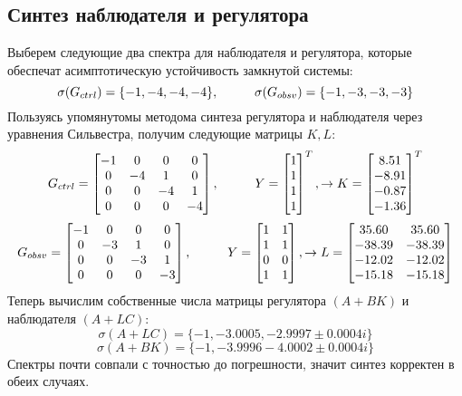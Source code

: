 \subsection{Синтез наблюдателя и регулятора}
Выберем следующие два спектра для наблюдателя и регулятора, которые обеспечат асимптотическую устойчивость замкнутой системы:
$$
    \sigma(G_{ctrl}) = \{-1, -4, -4, -4\}, \hspace*{1cm} \sigma(G_{obsv}) = \{-1, -3, -3, -3\}
$$
Пользуясь упомянутомы методома синтеза регулятора и наблюдателя через уравнения Сильвестра, получим следующие матрицы $K, L$:
$$
G_{ctrl} = \begin{bmatrix}
  -1  &   0  &   0  &   0 \\
  0  &  -4   &  1   &  0 \\
  0  &   0  &  -4  &   1 \\
  0   &  0   &  0  &  -4
\end{bmatrix}, \hspace*{1cm} Y = \begin{bmatrix} 1\\1\\1\\1 \end{bmatrix}^T, \rightarrow 
K = \begin{bmatrix} 8.51 \\ -8.91 \\ -0.87 \\ -1.36 \end{bmatrix}^T
$$
$$
G_{obsv} = \begin{bmatrix}
  -1  &   0  &   0  &   0 \\
  0  &  -3   &  1   &  0 \\
  0  &   0  &  -3  &   1 \\
  0   &  0   &  0  &  -3
\end{bmatrix}, \hspace*{1cm} Y = \begin{bmatrix}1&1\\1&1\\0&0\\1&1\end{bmatrix},\rightarrow
L = \begin{bmatrix}
  35.60 & 35.60\\
 -38.39 & -38.39\\
 -12.02 & -12.02\\
 -15.18 & -15.18
\end{bmatrix}
$$
Теперь вычислим собственные числа матрицы регулятора $(A+BK)$ и наблюдателя $(A+LC)$:
$$
    \sigma(A+LC) = \{-1, -3.0005, -2.9997 \pm 0.0004i\}
$$
$$
  \sigma(A+BK) = \{-1, -3.9996   -4.0002 \pm 0.0004i\}
$$
Спектры почти совпали с точностью до погрешности, значит синтез корректен в обеих случаях.
\newpage
